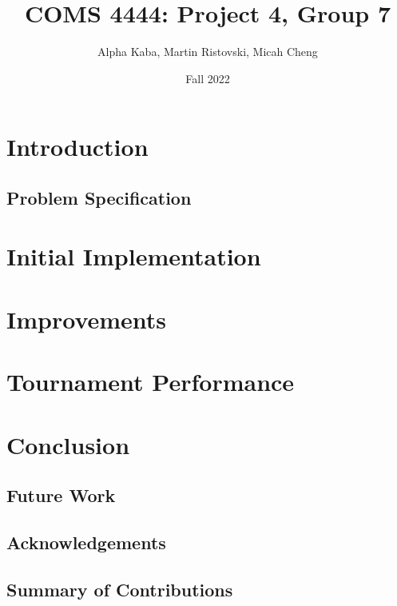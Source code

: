 \documentclass[titlepage]{article}
\title{COMS 4444: Project 4, Group 7}
\author{Alpha Kaba, Martin Ristovski, Micah Cheng}
\date{Fall 2022}
\begin{document}
\maketitle

\tableofcontents

\pagebreak

\section{Introduction}

\subsection{Problem Specification}


\section{Initial Implementation}


\section{Improvements}


\section{Tournament Performance}


\section{Conclusion}

\subsection{Future Work}

\subsection{Acknowledgements}

\subsection{Summary of Contributions}
\end{document}
